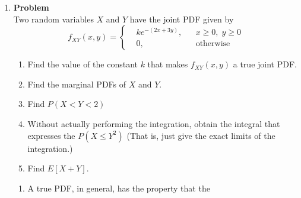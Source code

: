 \documentclass[12pt]{article}
\newenvironment{Ex}{\textbf{Problem}\vspace{.75em}\\}{}
\begin{document}
\begin{enumerate}
\begin{Ex}
\begin{solution}
\begin{multicols}{2}
\begin{equation}
\begin{aligned}
            \implies \mu_X &= 5 \\
          \end{aligned}
        \end{equation} &
        \begin{equation}
          \label{eq:5-mean}
          \begin{aligned}
            \sigma_X^2 &= \frac{(\theta_2 - \theta_1)^2}{12} \\
            &= \frac{100}{12} \\
            \implies \sigma_X^2 &= 8.3333 \\
            \implies \sigma_X &= 2.8868 \\
          \end{aligned}
        \end{equation}
      \end{multicols}
      The probability that $X$ lies in between the standard deviation
      from the mean is $0.5774$.
    \end{solution}
  \end{Ex}
\item
  \begin{Ex}
    Two random variables $X$ and $Y$ have the joint PDF given by
    \begin{equation}
      \label{eq:6-question}
      f_{XY}(x,y) = \left\{
        \begin{aligned}
          & ke^{-(2x+3y)}, && x \ge 0,\; y \ge 0 \\
          & 0, && \text{otherwise}
        \end{aligned} \right.
    \end{equation}
    \begin{enumerate}
    \item Find the value of the constant $k$ that makes $f_{XY}(x,
      y)$ a true joint PDF.
    \item Find the marginal PDFs of $X$ and $Y$.
    \item Find $P(X<Y<2)$
    \item Without actually performing the integration, obtain the
      integral that expresses the $P(X \le Y^2)$ (That is, just give
      the exact limits of the integration.)
    \item Find $E[X +Y]$.
    \end{enumerate}
    \begin{solution} \hfill
      \begin{enumerate}
      \item A true PDF, in general, has the property that the

\end{enumerate}
\end{solution}
\end{Ex}
\end{enumerate}
\end{document}

